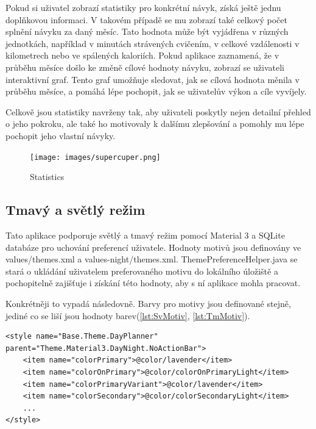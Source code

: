 Pokud si uživatel zobrazí statistiky pro konkrétní návyk, získá ještě jednu doplňkovou informaci. V takovém případě se mu zobrazí také celkový počet splnění návyku za daný měsíc. Tato hodnota může být vyjádřena v různých jednotkách, například v minutách strávených cvičením, v celkové vzdálenosti v kilometrech nebo ve spálených kaloriích.  
\newpage
Pokud aplikace zaznamená, že v průběhu měsíce došlo ke změně cílové hodnoty návyku, zobrazí se uživateli interaktivní graf. Tento graf umožňuje sledovat, jak se cílová hodnota měnila v průběhu měsíce, a pomáhá lépe pochopit, jak se uživatelův výkon a cíle vyvíjely.  

Celkově jsou statistiky navrženy tak, aby uživateli poskytly nejen detailní přehled o jeho pokroku, ale také ho motivovaly k dalšímu zlepšování a pomohly mu lépe pochopit jeho vlastní návyky.
\begin{figure}[H]
    \centering
    \texttt{[image: images/supercuper.png]}
    \caption{Statistics}
    \label{fig:Statistics}
\end{figure}

\newpage

\subsection{Tmavý a světlý režim}
\hspace{14pt} Tato aplikace podporuje světlý a tmavý režim pomocí Material 3 a SQLite databáze pro uchování preferencí uživatele. Hodnoty motivů jsou definovány ve values/themes.xml a values-night/themes.xml. ThemePreferenceHelper.java se stará o ukládání uživatelem preferovaného motivu do lokálního úložiště a pochopitelně zajišťuje i získání této hodnoty, aby s ní aplikace mohla pracovat. 

Konkrétněji to vypadá následovně. Barvy pro motivy jsou definované stejně, jediné co se liší jsou hodnoty barev(\autoref{lst:SvMotiv}, \autoref{lst:TmMotiv}).

\begin{lstlisting}[style=xmlstyle,caption = {Hodnoty světlého motivu},label = {lst:SvMotiv}]
<style name="Base.Theme.DayPlanner" parent="Theme.Material3.DayNight.NoActionBar">
    <item name="colorPrimary">@color/lavender</item>
    <item name="colorOnPrimary">@color/colorOnPrimaryLight</item>
    <item name="colorPrimaryVariant">@color/lavender</item>
    <item name="colorSecondary">@color/colorSecondaryLight</item>
    ...
</style>
\end{lstlisting}

